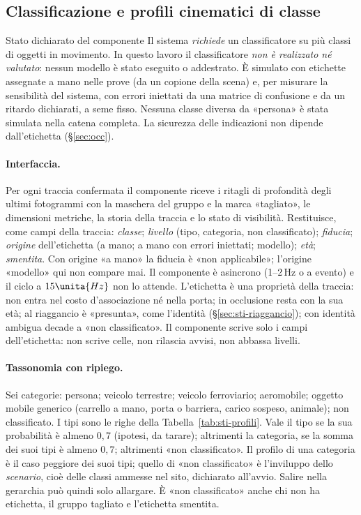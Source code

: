\subsection{Classificazione e profili cinematici di classe}\label{sec:sti-classi}

\begin{riquadro}{Stato dichiarato del componente}
Il sistema \emph{richiede} un classificatore su più classi di oggetti in movimento. In questo lavoro il classificatore \emph{non è realizzato né valutato}: nessun modello è stato eseguito o addestrato. È simulato con etichette assegnate a mano nelle prove (da un copione della scena) e, per misurare la sensibilità del sistema, con errori iniettati da una matrice di confusione e da un ritardo dichiarati, a seme fisso. Nessuna classe diversa da «persona» è stata simulata nella catena completa. La sicurezza delle indicazioni non dipende dall'etichetta (\S\ref{sec:occ}).
\end{riquadro}

\paragraph{Interfaccia.} Per ogni traccia confermata il componente riceve i ritagli di profondità degli ultimi fotogrammi con la maschera del gruppo e la marca «tagliato», le dimensioni metriche, la storia della traccia e lo stato di visibilità. Restituisce, come campi della traccia: \emph{classe}; \emph{livello} (tipo, categoria, non classificato); \emph{fiducia}; \emph{origine} dell'etichetta (a mano; a mano con errori iniettati; modello); \emph{età}; \emph{smentita}. Con origine «a mano» la fiducia è «non applicabile»; l'origine «modello» qui non compare mai. Il componente è asincrono (1--2\,Hz o a evento) e il ciclo a $15\unita{Hz}$ non lo attende. L'etichetta è una proprietà della traccia: non entra nel costo d'associazione né nella porta; in occlusione resta con la sua età; al riaggancio è «presunta», come l'identità (\S\ref{sec:sti-riaggancio}); con identità ambigua decade a «non classificato». Il componente scrive solo i campi dell'etichetta: non scrive celle, non rilascia avvisi, non abbassa livelli.

\paragraph{Tassonomia con ripiego.} Sei categorie: persona; veicolo terrestre; veicolo ferroviario; aeromobile; oggetto mobile generico (carrello a mano, porta o barriera, carico sospeso, animale); non classificato. I tipi sono le righe della Tabella~\ref{tab:sti-profili}. Vale il tipo se la sua probabilità è almeno $0{,}7$ (ipotesi, da tarare); altrimenti la categoria, se la somma dei suoi tipi è almeno $0{,}7$; altrimenti «non classificato». Il profilo di una categoria è il caso peggiore dei suoi tipi; quello di «non classificato» è l'inviluppo dello \emph{scenario}, cioè delle classi ammesse nel sito, dichiarato all'avvio. Salire nella gerarchia può quindi solo allargare. È «non classificato» anche chi non ha etichetta, il gruppo tagliato e l'etichetta smentita.

